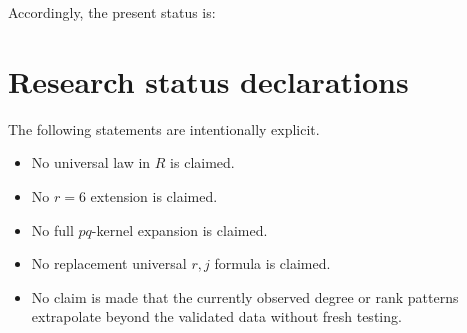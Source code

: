 \documentclass[11pt,a4paper]{article}
\begin{document}
Accordingly, the present status is:
\begin{center}
\end{center}

\section*{Research status declarations}

The following statements are intentionally explicit.
\begin{itemize}
\item No universal law in $R$ is claimed.
\item No $r=6$ extension is claimed.
\item No full $pq$-kernel expansion is claimed.
\item No replacement universal $r,j$ formula is claimed.
\item No claim is made that the currently observed degree or rank patterns extrapolate beyond the validated data without fresh testing.
\end{itemize}
\end{document}

